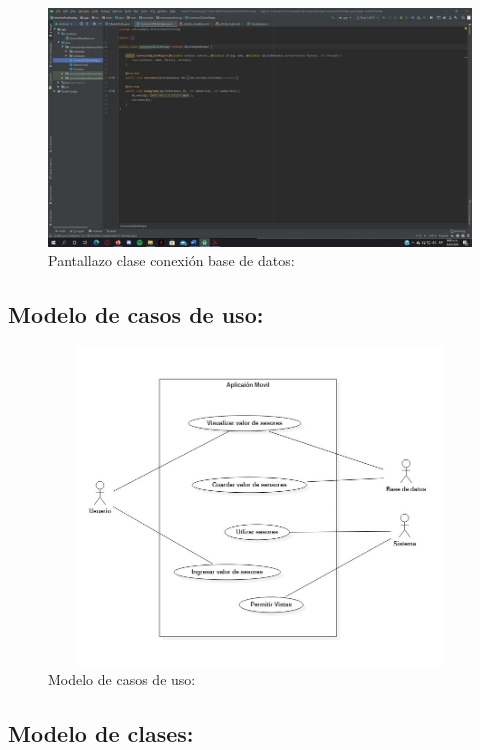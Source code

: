 \documentclass[conference,compsoc,onecolumn]{IEEEtran}
\begin{document}
 \begin{figure}[H]
\centering
\includegraphics[keepaspectratio, scale=0.5, width=\textwidth]{Imagenes/Imagen6.jpg}
\caption{Pantallazo clase conexión base de datos:}
\end{figure}
\enskip
\subsection{Modelo de casos de uso:}

 \begin{figure}[H]
\centering
\includegraphics[keepaspectratio, width=400pt ,height=239pt]{Imagenes/Imagen7.jpg}
\caption{Modelo de casos de uso:}
\end{figure}

\subsection{Modelo de clases:}
\end{document}
